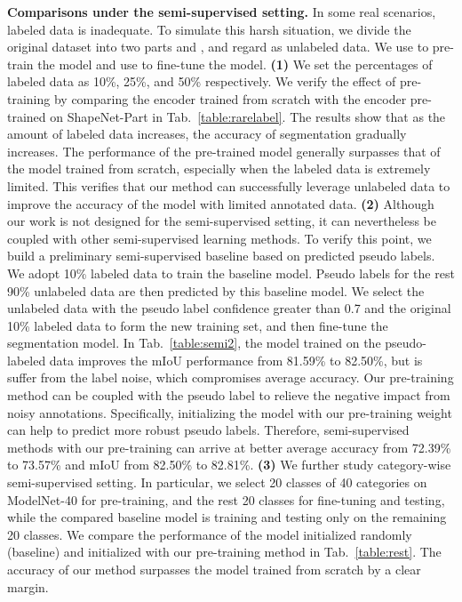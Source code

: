 \documentclass[journal]{IEEEtran}
\begin{document}
\textbf{Comparisons under the semi-supervised setting.} In some real scenarios, labeled data is inadequate. To simulate this harsh situation, we divide the original dataset into two parts  and , and regard  as unlabeled data. 
We use  to pre-train the model and use  to fine-tune the model.
\textbf{(1)} We set the percentages of labeled data as 10\%, 25\%, and 50\% respectively. We verify the effect of pre-training by comparing the encoder trained from scratch with the encoder pre-trained on ShapeNet-Part in Tab.~\ref{table:rarelabel}. 
The results show that as the amount of labeled data increases, the accuracy of segmentation gradually increases. The performance of the pre-trained model generally surpasses that of the model trained from scratch, especially when the labeled data is extremely limited. This verifies that our method can successfully leverage unlabeled data to improve the accuracy of the model with limited annotated data. 
\textbf{(2)} Although our work is not designed for the semi-supervised setting, it can nevertheless be coupled with other semi-supervised learning methods. To verify this point, we build a preliminary semi-supervised baseline based on predicted pseudo labels. We adopt 10\% labeled data to train the baseline model. Pseudo labels for the rest 90\% unlabeled data are then predicted by this baseline model.  
We select the unlabeled data with the pseudo label confidence greater than 0.7 and the original 10\% labeled data to form the new training set, and then fine-tune the segmentation model. 
In Tab.~\ref{table:semi2}, the model trained on the pseudo-labeled data improves the mIoU performance from 81.59\% to 82.50\%, but is suffer from the label noise, which compromises average accuracy. Our pre-training method can be coupled with the pseudo label to relieve the negative impact from noisy annotations. 
Specifically, initializing the model with our pre-training weight can help to predict more robust pseudo labels. Therefore, semi-supervised methods with our pre-training can arrive at better average accuracy from 72.39\% to 73.57\% and mIoU from 82.50\% to 82.81\%.
\textbf{(3)} We further study category-wise semi-supervised setting. In particular, we select 20 classes of 40 categories on ModelNet-40 for pre-training, and the rest 20 classes for fine-tuning and testing, while the compared baseline model is training and testing only on the remaining 20 classes. We compare the performance of the model initialized randomly (baseline) and initialized with our pre-training method in Tab.~\ref{table:rest}. The accuracy of our method surpasses the model trained from scratch by a clear margin.
\end{document}
